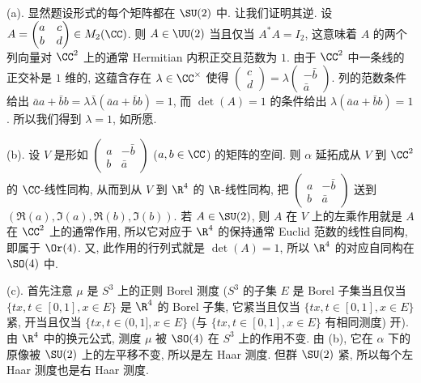\begin{solution}
(a). 显然题设形式的每个矩阵都在 $\SU(2)$ 中. 让我们证明其逆. 设 $A = \begin{pmatrix} a & c \\ b & d \end{pmatrix} \in M_2(\CC)$. 则 $A \in \UU(2)$ 当且仅当 $A^*A = I_2$, 这意味着 $A$ 的两个列向量对 $\CC^2$ 上的通常 Hermitian 内积正交且范数为 $1$. 由于 $\CC^2$ 中一条线的正交补是 $1$ 维的, 这蕴含存在 $\lambda \in \CC^{\times}$ 使得 $\begin{pmatrix} c \\ d \end{pmatrix} = \lambda\begin{pmatrix} -\bar{b} \\ \bar{a} \end{pmatrix}$. 列的范数条件给出 $\bar{a}a + \bar{b}b = \lambda\bar{\lambda}(\bar{a}a + \bar{b}b) = 1$, 而 $\det(A) = 1$ 的条件给出 $\lambda(\bar{a}a + \bar{b}b) = 1$. 所以我们得到 $\lambda = 1$, 如所愿.

(b). 设 $V$ 是形如 $\begin{pmatrix} a & -\bar{b} \\ b & \bar{a} \end{pmatrix}$ ($a, b \in \CC$) 的矩阵的空间. 则 $\alpha$ 延拓成从 $V$ 到 $\CC^2$ 的 $\CC$-线性同构, 从而到从 $V$ 到 $\R^4$ 的 $\R$-线性同构, 把 $\begin{pmatrix} a & -\bar{b} \\ b & \bar{a} \end{pmatrix}$ 送到 $(\Re(a), \Im(a), \Re(b), \Im(b))$. 若 $A \in \SU(2)$, 则 $A$ 在 $V$ 上的左乘作用就是 $A$ 在 $\CC^2$ 上的通常作用, 所以它对应于 $\R^4$ 的保持通常 Euclid 范数的线性自同构, 即属于 $\Or(4)$. 又, 此作用的行列式就是 $\det(A) = 1$, 所以 $\R^4$ 的对应自同构在 $\SO(4)$ 中.

(c). 首先注意 $\mu$ 是 $S^3$ 上的正则 Borel 测度 ($S^3$ 的子集 $E$ 是 Borel 子集当且仅当 $\{tx, t \in [0,1], x \in E\}$ 是 $\R^4$ 的 Borel 子集, 它紧当且仅当 $\{tx, t \in [0,1], x \in E\}$ 紧, 开当且仅当 $\{tx, t \in (0,1], x \in E\}$ (与 $\{tx, t \in [0,1], x \in E\}$ 有相同测度) 开).
由 $\R^4$ 中的换元公式, 测度 $\mu$ 被 $\SO(4)$ 在 $S^3$ 上的作用不变. 由 (b), 它在 $\alpha$ 下的原像被 $\SU(2)$ 上的左平移不变, 所以是左 Haar 测度. 但群 $\SU(2)$ 紧, 所以每个左 Haar 测度也是右 Haar 测度.


\end{solution}
